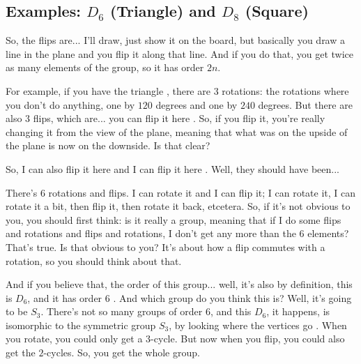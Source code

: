 \subsection{Examples: \texorpdfstring{$D_6$}{D\_6} (Triangle) and \texorpdfstring{$D_8$}{D\_8} (Square)}

\begin{speech}[00:27:14 - 00:29:07]
So, the flips are... I'll draw, just show it on the board, but basically you draw a line in the plane and you flip it along that line. And if you do that, you get twice as many elements of the group, so it has order $2n$.

For example, if you have the triangle , there are $3$ rotations: the rotations where you don't do anything, one by $120$ degrees and one by $240$ degrees. But there are also $3$ flips, which are... you can flip it here . So, if you flip it, you're really changing it from the view of the plane, meaning that what was on the upside of the plane is now on the downside. Is that clear?

So, I can also flip it here  and I can flip it here . Well, they should have been...

There's $6$ rotations and flips. I can rotate it and I can flip it; I can rotate it, I can rotate it a bit, then flip it, then rotate it back, etcetera. So, if it's not obvious to you, you should first think: is it really a group, meaning that if I do some flips and rotations and flips and rotations, I don't get any more than the $6$ elements? That's true. Is that obvious to you? It's about how a flip commutes with a rotation, so you should think about that.

And if you believe that, the order of this group... well, it's also by definition, this is $D_6$, and it has order $6$ . And which group do you think this is? Well, it's going to be $S_3$. There's not so many groups of order $6$, and this $D_6$, it happens, is isomorphic to the symmetric group $S_3$, by looking where the vertices go . When you rotate, you could only get a $3$-cycle. But now when you flip, you could also get the $2$-cycles. So, you get the whole group.
\end{speech}

